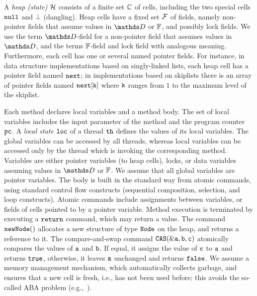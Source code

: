 A {\it heap (state)} ${\mathcal H}$ consists of a finite set
${\mathbb C}$ of cells, including the two special cells
${\tt null}$ and $\bot$ (dangling).
Heap cells have a fixed set $\mathcal{F}$ of fields, namely
non-pointer fields that assume values in
$\ddomain$ or $\mathbb{F}$, and possibly lock fields.
We use the term $\ddomain$-field for a non-pointer field that
assumes values in $\ddomain$, and the terms $\mathbb{F}$-field and lock field
with analogous meaning.
Furthermore, each cell has one or several named pointer fields.
For instance, in data structure implementations based on singly-linked lists,
each heap cell has a pointer field named $\tt next$; in implementations
based on skiplists there is an array of pointer fields named
$\tt next[k]$ where $\tt k$ ranges from $1$ to the maximum level of the
skiplist.

%
Each method declares local variables and a method body.
%
The set of local variables includes the input parameter of the method and
the program counter $\tt pc$.
A {\it local state} ${\tt loc}$ of a thread ${\tt th}$
defines  the values of its local variables.
The global variables can be
accessed by all threads, whereas local variables can be accessed only
by the thread which is invoking the corresponding method.
Variables are either pointer variables (to heap cells), locks, or data variables assuming values in $\ddomain$ or $\mathbb{F}$.
We assume that all global variables are pointer variables.
%
%
%
The body is built in the standard way
from atomic commands, using standard control
flow constructs (sequential composition, selection, and loop constructs).
%
%
%
Atomic commands include assignments between variables, 
or fields of cells pointed to by a pointer variable.
%
Method execution is terminated by executing a $\tt return$ command,
which may return a value.
%
The command $\tt new Node()$ allocates a new structure of type
$\tt Node$ on the heap, and returns a reference to it.
%
The compare-and-swap command $\tt CAS(\&a,b,c)$ atomically
compares the values of $\tt a$ and $\tt b$.
If  equal, it assigns the value of
$\tt c$ to $\tt a$  and returns $\tt true$, 
otherwise, it leaves $\tt a$ unchanged and returns $\tt false$. 
We assume a memory management mechanism, which automatically collects
garbage, and ensures that a new cell is fresh, i.e., has
not been used before; this avoids the so-called
ABA problem (e.g.,~\cite{MS:QueueAlgorithms}).
%


